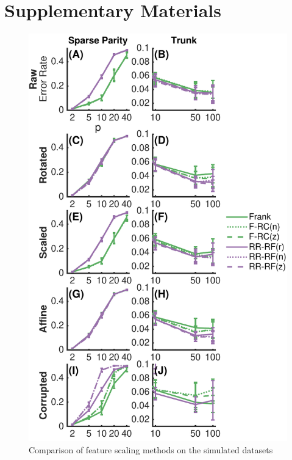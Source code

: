  



\clearpage
\section*{Supplementary Materials}
\beginsupplement

\begin{figure}[h!]
\begin{center}
\centerline{\includegraphics[width=0.8\columnwidth]{ROFLMAO_figS1_simulations_scaling_methods_2017_01_23}}
\caption{Comparison of feature scaling methods on the simulated datasets}
\label{simulation scaling}
\end{center}
\end{figure}

